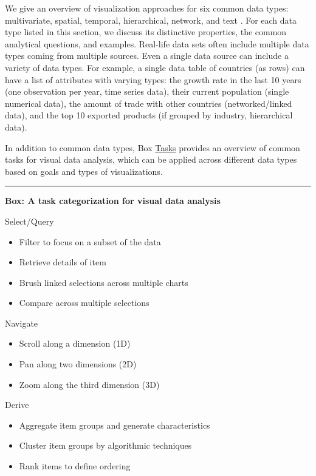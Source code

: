 \documentclass[]{krantz}
\providecommand{\tightlist}{%
  \setlength{\itemsep}{0pt}\setlength{\parskip}{0pt}}
\begin{document}
We give an overview of visualization approaches for six common data
types: multivariate, spatial, temporal, hierarchical, network, and text
\citep{shneiderman2015sharpening}. For each data type listed in this
section, we discuss its distinctive properties, the common analytical
questions, and examples. Real-life data sets often include multiple data
types coming from multiple sources. Even a single data source can
include a variety of data types. For example, a single data table of
countries (as rows) can have a list of attributes with varying types:
the growth rate in the last 10 years (one observation per year, time
series data), their current population (single numerical data), the
amount of trade with other countries (networked/linked data), and the
top 10 exported products (if grouped by industry, hierarchical data).

In addition to common data types, Box
\protect\hyperlink{box:viz2}{Tasks} provides an overview of common tasks
for visual data analysis, which can be applied across different data
types based on goals and types of visualizations.

\begin{center}\rule{0.5\linewidth}{\linethickness}\end{center}

\textbf{Box: A task categorization for visual data analysis}

Select/Query

\begin{itemize}
\tightlist
\item
  Filter to focus on a subset of the data
\item
  Retrieve details of item
\item
  Brush linked selections across multiple charts
\item
  Compare across multiple selections
\end{itemize}

Navigate

\begin{itemize}
\tightlist
\item
  Scroll along a dimension (1D)
\item
  Pan along two dimensions (2D)
\item
  Zoom along the third dimension (3D)
\end{itemize}

Derive

\begin{itemize}
\tightlist
\item
  Aggregate item groups and generate characteristics
\item
  Cluster item groups by algorithmic techniques
\item
  Rank items to define ordering
\end{itemize}
\end{document}
